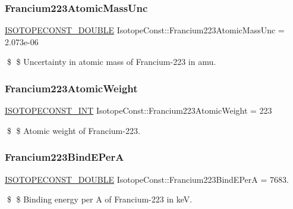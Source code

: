 \subsubsection{\texorpdfstring{Francium223\+Atomic\+Mass\+Unc}{Francium223AtomicMassUnc}}
{\footnotesize\ttfamily \mbox{\hyperlink{group___isotope_const-_macros_ga8f45a7272ce02c0b4c65c44636ed719a}{I\+S\+O\+T\+O\+P\+E\+C\+O\+N\+S\+T\+\_\+\+D\+O\+U\+B\+LE}} Isotope\+Const\+::\+Francium223\+Atomic\+Mass\+Unc = 2.\+073e-\/06}

\$ \$ Uncertainty in atomic mass of Francium-\/223 in amu. \mbox{\label{group___isotope_const-_francium-_fr223_ga98a0b7680e6ecd770d59c18386baf03c}} 
\subsubsection{\texorpdfstring{Francium223\+Atomic\+Weight}{Francium223AtomicWeight}}
{\footnotesize\ttfamily \mbox{\hyperlink{group___isotope_const-_macros_ga5f18360b3e99483a35c32d789e62621c}{I\+S\+O\+T\+O\+P\+E\+C\+O\+N\+S\+T\+\_\+\+I\+NT}} Isotope\+Const\+::\+Francium223\+Atomic\+Weight = 223}

\$ \$ Atomic weight of Francium-\/223. \mbox{\label{group___isotope_const-_francium-_fr223_gabcaa050a472012d0e1bbf045b226fa18}} 
\subsubsection{\texorpdfstring{Francium223\+Bind\+E\+PerA}{Francium223BindEPerA}}
{\footnotesize\ttfamily \mbox{\hyperlink{group___isotope_const-_macros_ga8f45a7272ce02c0b4c65c44636ed719a}{I\+S\+O\+T\+O\+P\+E\+C\+O\+N\+S\+T\+\_\+\+D\+O\+U\+B\+LE}} Isotope\+Const\+::\+Francium223\+Bind\+E\+PerA = 7683.}

\$ \$ Binding energy per A of Francium-\/223 in keV. \mbox{\label{group___isotope_const-_francium-_fr223_gae9bc88639ee9761d10665bec93f64def}} 
